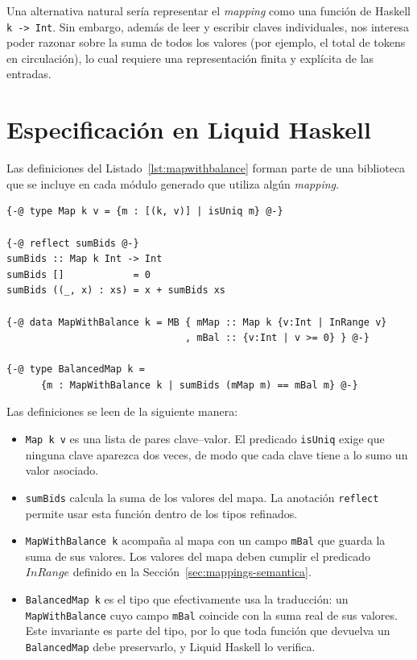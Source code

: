 Una alternativa natural sería representar el \emph{mapping} como una función de Haskell
\lstinline[language=LHaskell]|k -> Int|. Sin embargo, además de leer y escribir claves
individuales, nos interesa poder razonar sobre la suma de todos los valores (por
ejemplo, el total de tokens en circulación), lo cual requiere una representación
finita y explícita de las entradas.

\section{Especificación en Liquid Haskell}
\label{sec:mappings-representacion}

Las definiciones del Listado~\ref{lst:mapwithbalance} forman parte de una biblioteca
que se incluye en cada módulo generado que utiliza algún \emph{mapping}.

\begin{lstlisting}[language=LHaskell, caption={Representación de un \emph{mapping} (definiciones principales).}, label={lst:mapwithbalance}]
{-@ type Map k v = {m : [(k, v)] | isUniq m} @-}

{-@ reflect sumBids @-}
sumBids :: Map k Int -> Int
sumBids []            = 0
sumBids ((_, x) : xs) = x + sumBids xs

{-@ data MapWithBalance k = MB { mMap :: Map k {v:Int | InRange v}
                               , mBal :: {v:Int | v >= 0} } @-}

{-@ type BalancedMap k =
      {m : MapWithBalance k | sumBids (mMap m) == mBal m} @-}
\end{lstlisting}

Las definiciones se leen de la siguiente manera:

\begin{itemize}
  \item \lstinline[language=LHaskell]|Map k v| es una lista de pares clave--valor. El
    predicado \lstinline|isUniq| exige que ninguna clave aparezca dos veces, de modo que
    cada clave tiene a lo sumo un valor asociado.
  \item \lstinline[language=LHaskell]|sumBids| calcula la suma de los valores del mapa.
    La anotación \lstinline|reflect| permite usar esta función dentro de los tipos
    refinados.
  \item \lstinline[language=LHaskell]|MapWithBalance k| acompaña al mapa con un campo
    \lstinline|mBal| que guarda la suma de sus valores. Los valores del mapa deben
    cumplir el predicado $\mathit{InRange}$ definido en la
    Sección~\ref{sec:mappings-semantica}.
  \item \lstinline[language=LHaskell]|BalancedMap k| es el tipo que efectivamente usa la
    traducción: un \lstinline|MapWithBalance| cuyo campo \lstinline|mBal| coincide con
    la suma real de sus valores. Este invariante es parte del tipo, por lo que toda
    función que devuelva un \lstinline|BalancedMap| debe preservarlo, y Liquid Haskell
    lo verifica.
\end{itemize}

